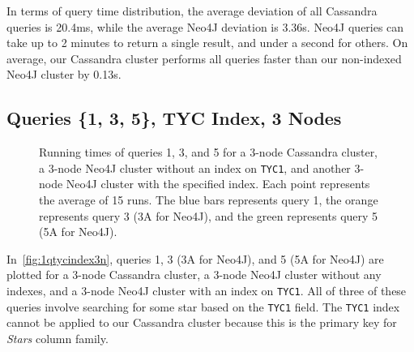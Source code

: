 In terms of query time distribution, the average deviation of all Cassandra queries is 20.4ms, while the average Neo4J
deviation is 3.36s.
Neo4J queries can take up to 2 minutes to return a single result, and under a second for others.
On average, our Cassandra cluster performs all queries faster than our non-indexed Neo4J cluster by 0.13s.

\subsection{Queries \{1, 3, 5\}, TYC Index, 3 Nodes}\label{subsec:queries135TycIndex3Nodes}
\begin{figure}
    \caption{Running times of queries 1, 3, and 5 for a 3-node Cassandra cluster, a 3-node Neo4J cluster without an
    index on \texttt{TYC1}, and another 3-node Neo4J cluster with the specified index.
    Each point represents the average of 15 runs.
    The blue bars represents query 1, the orange represents query 3 (3A for Neo4J), and the green represents query 5
    (5A for Neo4J).}\label{fig:1qtycindex3n}
\end{figure}

In~\autoref{fig:1qtycindex3n}, queries 1, 3 (3A for Neo4J), and 5 (5A for Neo4J) are plotted for a 3-node Cassandra
cluster, a 3-node Neo4J cluster without any indexes, and a 3-node Neo4J cluster with an index on \texttt{TYC1}.
All of three of these queries involve searching for some star based on the \texttt{TYC1} field.
The \texttt{TYC1} index cannot be applied to our Cassandra cluster because this is the primary key for \textit{Stars}
column family.

